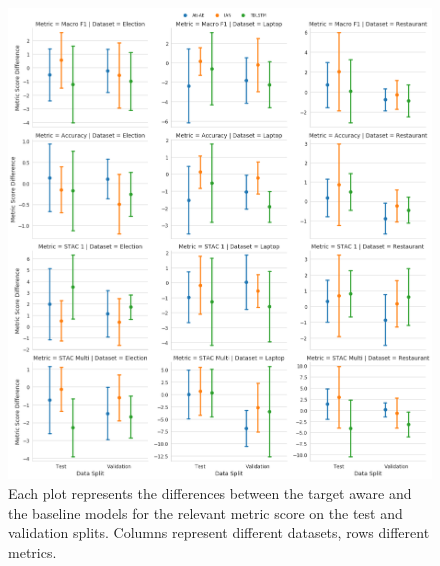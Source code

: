 \begin{figure}[!h]
    \centering
    \includegraphics[scale=0.4]{images/augmentation/methods_performance/Inter_Target/overall_difference_inter_target_scores.png}
    \caption{Each plot represents the differences between the target aware and the baseline models for the relevant metric score on the test and validation splits. Columns represent different datasets, rows different metrics.}
    \label{fig:aug_overall_difference_inter_target_scores}
\end{figure}

